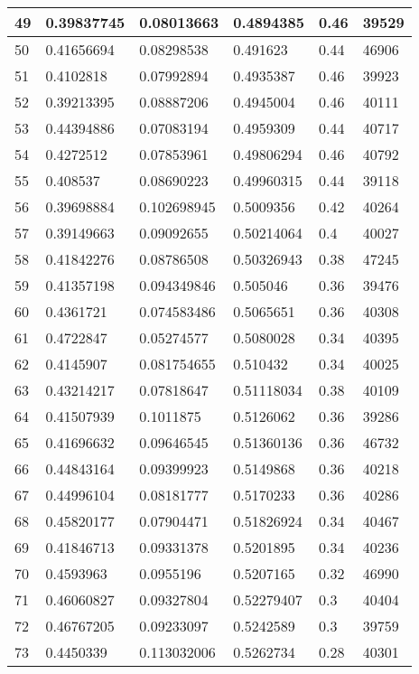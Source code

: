 \begin{longtable}{|l|l|l|l|l|l|}
49 & 0.39837745 & 0.08013663 & 0.4894385 & 0.46 & 39529 \\ \hline 
50 & 0.41656694 & 0.08298538 & 0.491623 & 0.44 & 46906 \\ \hline 
51 & 0.4102818 & 0.07992894 & 0.4935387 & 0.46 & 39923 \\ \hline 
52 & 0.39213395 & 0.08887206 & 0.4945004 & 0.46 & 40111 \\ \hline 
53 & 0.44394886 & 0.07083194 & 0.4959309 & 0.44 & 40717 \\ \hline 
54 & 0.4272512 & 0.07853961 & 0.49806294 & 0.46 & 40792 \\ \hline 
55 & 0.408537 & 0.08690223 & 0.49960315 & 0.44 & 39118 \\ \hline 
56 & 0.39698884 & 0.102698945 & 0.5009356 & 0.42 & 40264 \\ \hline 
57 & 0.39149663 & 0.09092655 & 0.50214064 & 0.4 & 40027 \\ \hline 
58 & 0.41842276 & 0.08786508 & 0.50326943 & 0.38 & 47245 \\ \hline 
59 & 0.41357198 & 0.094349846 & 0.505046 & 0.36 & 39476 \\ \hline 
60 & 0.4361721 & 0.074583486 & 0.5065651 & 0.36 & 40308 \\ \hline 
61 & 0.4722847 & 0.05274577 & 0.5080028 & 0.34 & 40395 \\ \hline 
62 & 0.4145907 & 0.081754655 & 0.510432 & 0.34 & 40025 \\ \hline 
63 & 0.43214217 & 0.07818647 & 0.51118034 & 0.38 & 40109 \\ \hline 
64 & 0.41507939 & 0.1011875 & 0.5126062 & 0.36 & 39286 \\ \hline 
65 & 0.41696632 & 0.09646545 & 0.51360136 & 0.36 & 46732 \\ \hline 
66 & 0.44843164 & 0.09399923 & 0.5149868 & 0.36 & 40218 \\ \hline 
67 & 0.44996104 & 0.08181777 & 0.5170233 & 0.36 & 40286 \\ \hline 
68 & 0.45820177 & 0.07904471 & 0.51826924 & 0.34 & 40467 \\ \hline 
69 & 0.41846713 & 0.09331378 & 0.5201895 & 0.34 & 40236 \\ \hline 
70 & 0.4593963 & 0.0955196 & 0.5207165 & 0.32 & 46990 \\ \hline 
71 & 0.46060827 & 0.09327804 & 0.52279407 & 0.3 & 40404 \\ \hline 
72 & 0.46767205 & 0.09233097 & 0.5242589 & 0.3 & 39759 \\ \hline 
73 & 0.4450339 & 0.113032006 & 0.5262734 & 0.28 & 40301 \\ \hline 

\end{longtable}
